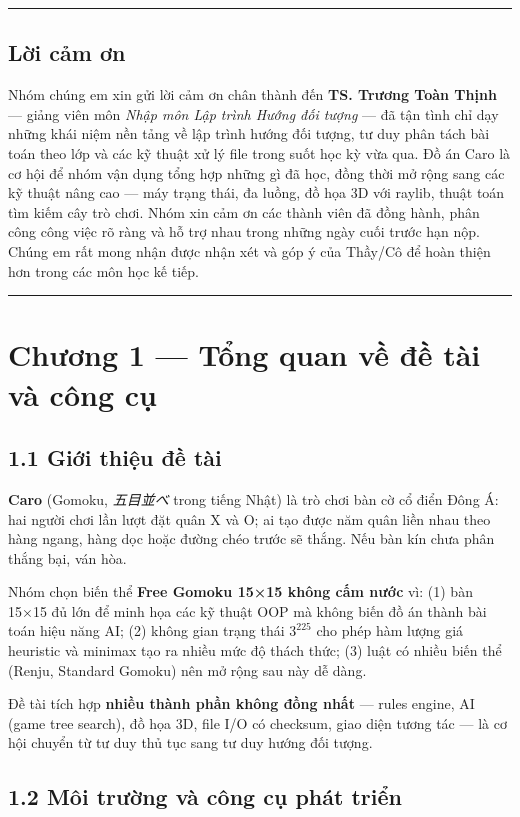 \documentclass[11pt,a4paper]{article}
\begin{document}
\noindent\rule{\textwidth}{0.5pt}
\subsection{Lời cảm ơn}
\label{sec:orga923083}

Nhóm chúng em xin gửi lời cảm ơn chân thành đến \textbf{TS. Trương Toàn Thịnh} — giảng viên môn \emph{Nhập môn Lập trình Hướng đối tượng} — đã tận tình chỉ dạy những khái niệm nền tảng về lập trình hướng đối tượng, tư duy phân tách bài toán theo lớp và các kỹ thuật xử lý file trong suốt học kỳ vừa qua. Đồ án Caro là cơ hội để nhóm vận dụng tổng hợp những gì đã học, đồng thời mở rộng sang các kỹ thuật nâng cao — máy trạng thái, đa luồng, đồ họa 3D với raylib, thuật toán tìm kiếm cây trò chơi. Nhóm xin cảm ơn các thành viên đã đồng hành, phân công công việc rõ ràng và hỗ trợ nhau trong những ngày cuối trước hạn nộp. Chúng em rất mong nhận được nhận xét và góp ý của Thầy/Cô để hoàn thiện hơn trong các môn học kế tiếp.

\noindent\rule{\textwidth}{0.5pt}
\section{Chương 1 — Tổng quan về đề tài và công cụ}
\label{sec:org27236ef}

\subsection{1.1 Giới thiệu đề tài}
\label{sec:orgade0e8c}

\textbf{Caro} (Gomoku, \emph{五目並べ} trong tiếng Nhật) là trò chơi bàn cờ cổ điển Đông Á: hai người chơi lần lượt đặt quân X và O; ai tạo được năm quân liền nhau theo hàng ngang, hàng dọc hoặc đường chéo trước sẽ thắng. Nếu bàn kín chưa phân thắng bại, ván hòa.

Nhóm chọn biến thể \textbf{Free Gomoku 15×15 không cấm nước} vì: (1) bàn 15×15 đủ lớn để minh họa các kỹ thuật OOP mà không biến đồ án thành bài toán hiệu năng AI; (2) không gian trạng thái \(3^{225}\) cho phép hàm lượng giá heuristic và minimax tạo ra nhiều mức độ thách thức; (3) luật có nhiều biến thể (Renju, Standard Gomoku) nên mở rộng sau này dễ dàng.

Đề tài tích hợp \textbf{nhiều thành phần không đồng nhất} — rules engine, AI (game tree search), đồ họa 3D, file I/O có checksum, giao diện tương tác — là cơ hội chuyển từ tư duy thủ tục sang tư duy hướng đối tượng.
\subsection{1.2 Môi trường và công cụ phát triển}
\label{sec:org60096ba}
\end{document}
